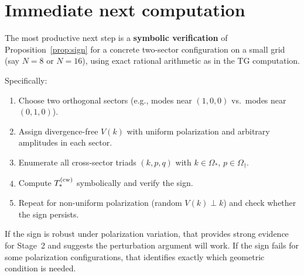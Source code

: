 \documentclass[11pt]{article}
\theoremstyle{definition}
\begin{document}
\section{Immediate next computation}

The most productive next step is a
\textbf{symbolic verification} of
Proposition~\ref{prop:sign} for a concrete
two-sector configuration on a small grid
(say $N=8$ or $N=16$), using exact rational
arithmetic as in the TG computation.

Specifically:
\begin{enumerate}
\item Choose two orthogonal sectors (e.g.,
  modes near $(1,0,0)$ vs.\ modes near
  $(0,1,0)$).
\item Assign divergence-free $V(k)$ with
  uniform polarization and arbitrary
  amplitudes in each sector.
\item Enumerate all cross-sector triads
  $(k,p,q)$ with $k\in\Omega_*$,
  $p\in\Omega_\dagger$.
\item Compute $T_*^{(\rm cw)}$ symbolically
  and verify the sign.
\item Repeat for non-uniform polarization
  (random $V(k)\perp k$) and check whether
  the sign persists.
\end{enumerate}

If the sign is robust under polarization
variation, that provides strong evidence for
Stage~2 and suggests the perturbation
argument will work.  If the sign fails for
some polarization configurations, that
identifies exactly which geometric condition
is needed.
\end{document}
